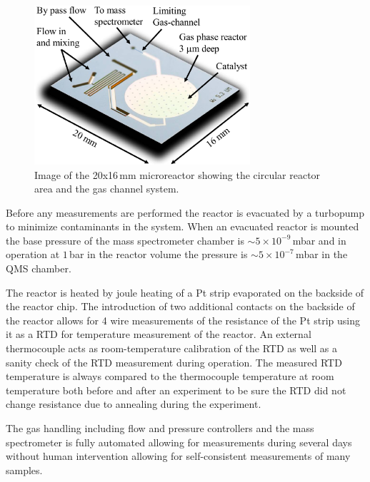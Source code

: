 \documentclass[journal=jacsat,manuscript=article]{achemso}
\begin{document}
\begin{figure}
 \includegraphics[width=8cm]{reactor.eps}
 \caption{Image of the 20x16\,mm microreactor showing the circular reactor area
and the gas channel system.}
  \label{fgr:reactor}
\end{figure}

Before any measurements are performed the reactor is evacuated by a turbopump to minimize
contaminants in the system. When an evacuated reactor is mounted the base
pressure of the mass spectrometer chamber is $\sim5\times10^{-9}\,$mbar and in
operation at $1\,$bar in the reactor volume the pressure is
$\sim5\times10^{-7}\,$mbar in the QMS chamber.

The reactor is heated by joule heating of a Pt strip evaporated on the backside
of the reactor chip. The introduction of two additional contacts on the
backside of the reactor allows for 4 wire measurements of the resistance of the
Pt strip using it as a RTD for temperature measurement of the reactor. An
external thermocouple acts as room-temperature calibration of the RTD as well
as a sanity check of the RTD measurement during operation. The measured RTD
temperature is always compared to the thermocouple temperature at room temperature both
before and after an experiment to be sure the RTD did not change resistance due
to annealing during the experiment.

The gas handling including flow and pressure controllers and the mass
spectrometer is fully automated allowing for measurements during several days
without human intervention allowing for self-consistent measurements of many
samples.
\end{document}
